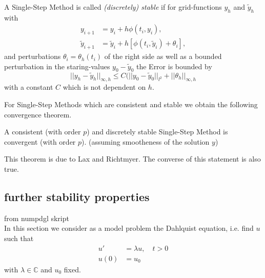 	\begin{definition}\label{Discrete_Stability_SingleStep - lecture notes for numpdgl}
		A Single-Step Method is called \emph{(discretely) stable} if for grid-functions $y_h$ and $\tilde{y}_h$ with
		\begin{align}
			y_{i+1} &= y_i + h \phi(t_i, y_i), \\
			\tilde{y}_{i+1} &=  \tilde{y}_i + h [\phi(t_i, \tilde{y}_i) + \theta_i],
		\end{align}
		and perturbations $\theta_i = \theta_h(t_i)$ of the right side as well as a bounded perturbation in the staring-values $y_0 - \tilde{y}_0$ the Error is bounded by
		\begin{displaymath}
			||y_h - \tilde{y}_h||_{\infty,h} \leq C (||y_0 - \tilde{y}_0||_{l^2} + ||\theta_h||_{\infty,h}
		\end{displaymath}
		with a constant $C$ which is not dependent on $h$.
	\end{definition}
	
	For Single-Step Methods which are consistent and stable we obtain the following convergence theorem.
	
	\begin{theorem}\label{Lax-Richtmyer}
		A consistent (with order $p$) and discretely stable Single-Step Method is convergent (with order $p$). (assuming smootheness of the solution $y$)
	\end{theorem}
	
	This theorem is due to Lax and Richtmyer. The converse of this statement is also true. 

	\subsection{further stability properties}
		from numpdgl skript \\
		In this section we consider as a model problem the Dahlquist equation, i.e. find $u$ such that
		\begin{align}
			u' &= \lambda u, \quad t > 0 \\
			u(0) &= u_0
		\end{align}
		with $\lambda \in \mathbb{C}$ and $u_0$ fixed.
		

